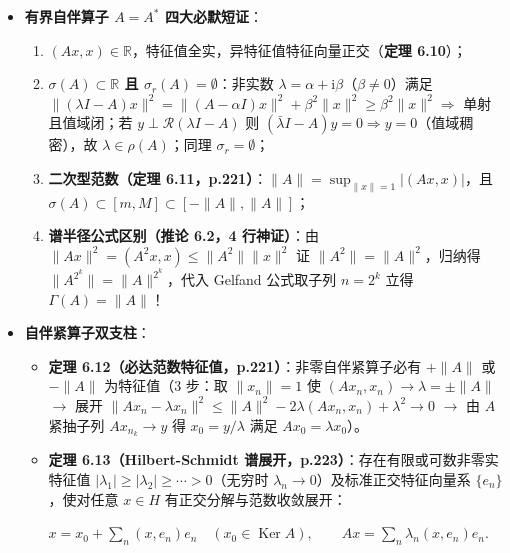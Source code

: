 \documentclass[11pt,a4paper]{article}
\providecommand{\tightlist}{\setlength{\itemsep}{1.8pt}\setlength{\parskip}{0pt}}
\newcommand{\FitDisplayMath}[1]{%
  \par\vspace{4pt}\noindent
  \begin{adjustbox}{max width=\linewidth, center}
    $\displaystyle #1$
  \end{adjustbox}
  \par\vspace{4pt}%
}
\begin{document}
\begin{itemize}
\tightlist
\item
  \textbf{有界自伴算子 \(A=A^*\) 四大必默短证}：

  \begin{enumerate}
  \def\labelenumi{\arabic{enumi}.}
  \tightlist
  \item
    \((Ax,x)\in\mathbb{R}\)，特征值全实，异特征值特征向量正交（\textbf{定理 6.10}）；
  \item
    \textbf{\(\sigma(A)\subset\mathbb{R}\) 且 \(\sigma_r(A)=\emptyset\)}：非实数 \(\lambda=\alpha+\mathrm{i}\beta\)（\(\beta\neq 0\)）满足 \(\lVert(\lambda I-A)x\rVert^2=\lVert(A-\alpha I)x\rVert^2+\beta^2\lVert x\rVert^2\ge\beta^2\lVert x\rVert^2\Rightarrow\) 单射且值域闭；若 \(y\perp\mathcal{R}(\lambda I-A)\) 则 \((\bar{\lambda}I-A)y=0\Rightarrow y=0\)（值域稠密），故 \(\lambda\in\rho(A)\)；同理 \(\sigma_r=\emptyset\)；
  \item
    \textbf{二次型范数（定理 6.11，p.221）}：\(\lVert A\rVert=\sup_{\lVert x\rVert=1}\lvert(Ax,x)\rvert\)，且 \(\sigma(A)\subset[m,M]\subset[-\lVert A\rVert,\lVert A\rVert]\)；
  \item
    \textbf{谱半径公式区别（推论 6.2，4 行神证）}：由 \(\lVert Ax\rVert^2=(A^2x,x)\le\lVert A^2\rVert\lVert x\rVert^2\) 证 \(\lVert A^2\rVert=\lVert A\rVert^2\)，归纳得 \(\lVert A^{2^k}\rVert=\lVert A\rVert^{2^k}\)，代入 Gelfand 公式取子列 \(n=2^k\) 立得 \textbf{\(\Gamma(A)=\lVert A\rVert\)}！
  \end{enumerate}
\item
  \textbf{自伴紧算子双支柱}：

  \begin{itemize}
  \tightlist
  \item
    \textbf{定理 6.12（必达范数特征值，p.221）}：非零自伴紧算子必有 \(+\lVert A\rVert\) 或 \(-\lVert A\rVert\) 为特征值（3 步：取 \(\lVert x_n\rVert=1\) 使 \((Ax_n,x_n)\to\lambda=\pm\lVert A\rVert\) \(\to\) 展开 \(\lVert Ax_n-\lambda x_n\rVert^2\le\lVert A\rVert^2-2\lambda(Ax_n,x_n)+\lambda^2\to 0\) \(\to\) 由 \(A\) 紧抽子列 \(Ax_{n_k}\to y\) 得 \(x_0=y/\lambda\) 满足 \(Ax_0=\lambda x_0\)）。
  \item
    \textbf{定理 6.13（Hilbert-Schmidt 谱展开，p.223）}：存在有限或可数非零实特征值 \(\lvert\lambda_1\rvert\ge\lvert\lambda_2\rvert\ge\cdots>0\)（无穷时 \(\lambda_n\to 0\)）及标准正交特征向量系 \(\{e_n\}\)，使对任意 \(x\in H\) 有正交分解与范数收敛展开： 
\FitDisplayMath{x = x_0 + \sum_n (x,e_n)e_n \quad (x_0\in\operatorname{Ker}A), \qquad Ax = \sum_n \lambda_n(x,e_n)e_n.}

  \end{itemize}
\end{itemize}
\end{document}
